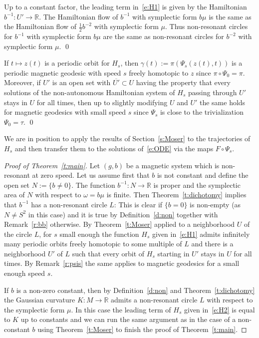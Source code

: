 \documentclass[AHL,Unicode,longabstracts,published]{cedram}
\newcommand{\R}{\mathbb{R}}
\begin{document}
\begin{rema}\label{r:bb}
Up to a constant factor, the leading term in~\eqref{e:H1} is given by the Hamiltonian $b^{-1}:U'\to\R$. The Hamiltonian flow of $b^{-1}$ with symplectic form $b\mu$ is the same as the Hamiltonian flow of $\tfrac12b^{-2}$ with symplectic form $\mu$. Thus non-resonant circles for $b^{-1}$ with symplectic form $b\mu$ are the same as non-resonant circles for $b^{-2}$ with symplectic form $\mu$. \qed
\end{rema}

\begin{rema}\label{r:psis}
If $t\mapsto z(t)$ is a periodic orbit for $H_s$, then $\gamma(t):=\pi(\Psi_s(z(t),t))$ is a periodic magnetic geodesic with speed $s$ freely homotopic to $z$ since $\pi\circ\Psi_0=\pi$. Moreover, if $U'$ is an open set with $\overline{U'}\subset U$ having the property that every solutions of the non-autonomous Hamiltonian system of $H_s$ passing through $U'$ stays in $U$ for all times, then up to slightly modifying $U$ and $U'$ the same holds for magnetic geodesics with small speed $s$ since $\Psi_s$ is close to the trivialization $\Psi_0=\tau$. \qed
\end{rema}

We are in position to apply the results of Section~\ref{s:Moser} to the trajectories of $H_s$ and then transfer them to the solutions of~\eqref{e:ODE} via the maps $F\circ\Psi_s$.

\begin{proof}[Proof of Theorem~\ref{t:main}]
Let $(g,b)$ be a magnetic system which is non-resonant at zero speed. Let us assume first that $b$ is not constant and define the open set $N:=\{b\neq0\}$. The function $b^{-1}:N\to\R$ is proper and the symplectic area of $N$ with respect to $\omega=b\mu$ is finite. Then Theorem~\ref{t:dichotomy} implies that $b^{-1}$ has a non-resonant circle $L$: This is clear if $\{b=0\}$ is non-empty (as $N\neq S^2$ in this case) and it is true by Definition~\ref{d:non} together with Remark~\ref{r:bb} otherwise. By Theorem~\ref{t:Moser} applied to a neighborhood $U$ of the circle $L$, for $s$ small enough the function $H_s$ given in~\eqref{e:H1} admits infinitely many periodic orbits freely homotopic to some multiple of $L$ and there is a neighborhood $U'$ of $L$ such that every orbit of $H_s$ starting in $U'$ stays in $U$ for all times. By Remark~\ref{r:psis} the same applies to magnetic geodesics for a small enough speed $s$.

If $b$ is a non-zero constant, then by Definition~\ref{d:non} and Theorem~\ref{t:dichotomy} the Gaussian curvature $K:M\to\R$ admits a non-resonant circle $L$ with respect to the symplectic form $\mu$. In this case the leading term of $H_s$ given in~\eqref{e:H2} is equal to $K$ up to constants and we can run the same argument as in the case of a non-constant $b$ using Theorem~\ref{t:Moser} to finish the proof of Theorem~\ref{t:main}.
\end{proof}
\end{document}
